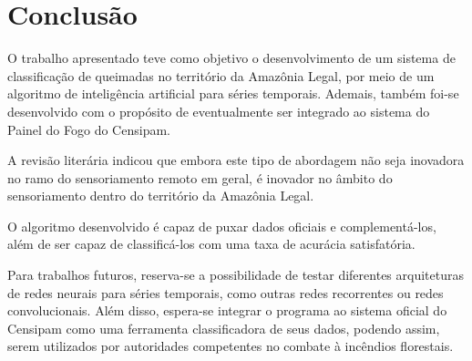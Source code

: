 \chapter{Conclusão}
\label{conclusao}

O trabalho apresentado teve como objetivo o desenvolvimento de um sistema de classificação de queimadas no território da Amazônia Legal, por meio de um algoritmo de inteligência artificial para séries temporais. Ademais, também foi-se desenvolvido com o propósito de eventualmente ser integrado ao sistema do Painel do Fogo do Censipam.

A revisão literária indicou que embora este tipo de abordagem não seja inovadora no ramo do sensoriamento remoto em geral, é inovador no âmbito do sensoriamento dentro do território da Amazônia Legal.

O algoritmo desenvolvido é capaz de puxar dados oficiais e complementá-los, além de ser capaz de classificá-los com uma taxa de acurácia satisfatória.

Para trabalhos futuros, reserva-se a possibilidade de testar diferentes arquiteturas de redes neurais para séries temporais, como outras redes recorrentes ou redes convolucionais. Além disso, espera-se integrar o programa ao sistema oficial do Censipam como uma ferramenta classificadora de seus dados, podendo assim, serem utilizados por autoridades competentes no combate à incêndios florestais.





